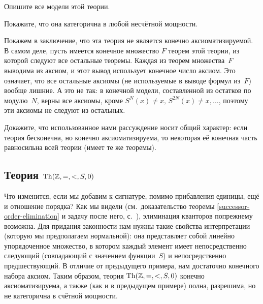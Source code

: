 \begin{problem}
Опишите все модели этой теории.
\end{problem}

\begin{problem}
Покажите, что она категорична в любой несчётной мощности.
\end{problem}

Покажем в заключение, что эта теория не является конечно
аксиоматизируемой. В самом деле, пусть имеется конечное
множество $F$ теорем этой теории, из которой следуют все
остальные теоремы. Каждая из теорем множества~$F$ выводима из
аксиом, и этот вывод использует конечное число аксиом. Это
означает, что все остальные аксиомы (не используемые в выводе
формул из~$F$) вообще лишние. А это не так: в конечной модели,
составленной из остатков по модулю~$N$, верны все аксиомы,
кроме $S^{N}(x)\ne x,\,S^{2N}(x)\ne x,\dots$, поэтому эти аксиомы
не следуют из остальных.

\begin{problem}
Докажите, что использованное нами рассуждение носит общий характер:
если теория бесконечна, но конечно аксиоматизируема, то
некоторая её конечная часть равносильна всей теории (имеет те же
теоремы).
\end{problem}

\subsection*{Теория $\operatorname{Th}(\mathbb{Z},{=},{<},{S},0)$}
%

Что изменится, если мы добавим к сигнатуре, помимо прибавления
единицы, ещё и отношение порядка? Как мы видели (см.\
доказательство теоремы \ref{successor-order-elimination} и
задачу после него, с.~\pageref{successor-order-elimination}),
элиминация кванторов по\д прежнему возможна. Для придания
законности нам нужны такие свойства интерпретации (которую мы
предполагаем нормальной): она представляет собой линейно
упорядоченное множество, в котором каждый элемент имеет
непосредственно следующий (совпадающий с значением функции~$S$)
и непосредственно предшествующий. В отличие от предыдущего
примера, нам достаточно конечного набора аксиом. Таким образом,
теория $\operatorname{Th}(\mathbb{Z},{=},{<},{S},0)$ конечно аксиоматизируема,
а также (как и в предыдущем примере) полна, разрешима, но не
категорична в счётной мощности.

